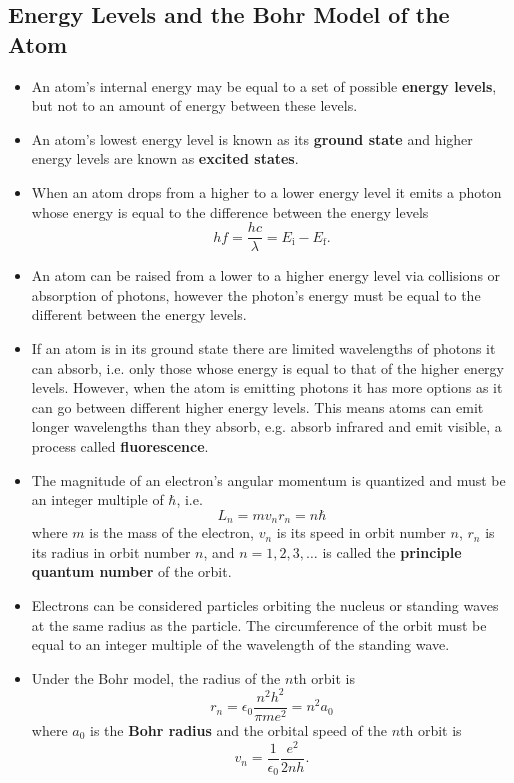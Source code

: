 \documentclass{article}
\begin{document}
\subsection{Energy Levels and the Bohr Model of the Atom}

\begin{itemize}
  \item An atom's internal energy may be equal to a set of possible \textbf{energy levels}, but not to an amount of energy between these levels.

  \item An atom's lowest energy level is known as its \textbf{ground state} and higher energy levels are known as \textbf{excited states}.

  \item When an atom drops from a higher to a lower energy level it emits a photon whose energy is equal to the difference between the energy levels \[h f = \frac{h c}{\lambda} = E_\text{i} - E_\text{f}.\]

  \item An atom can be raised from a lower to a higher energy level via collisions or absorption of photons, however the photon's energy must be equal to the different between the energy levels.

  \item If an atom is in its ground state there are limited wavelengths of photons it can absorb, i.e. only those whose energy is equal to that of the higher energy levels. However, when the atom is emitting photons it has more options as it can go between different higher energy levels. This means atoms can emit longer wavelengths than they absorb, e.g. absorb infrared and emit visible, a process called \textbf{fluorescence}.

  \item The magnitude of an electron's angular momentum is quantized and must be an integer multiple of $\hbar$, i.e. \[L_n = m v_n r_n = n \hbar\] where $m$ is the mass of the electron, $v_n$ is its speed in orbit number $n$, $r_n$ is its radius in orbit number $n$, and $n = 1, 2, 3, \ldots$ is called the \textbf{principle quantum number} of the orbit.

  \item Electrons can be considered particles orbiting the nucleus or standing waves at the same radius as the particle. The circumference of the orbit must be equal to an integer multiple of the wavelength of the standing wave.

  \item Under the Bohr model, the radius of the $n$th orbit is \[r_n = \epsilon_0 \frac{n^2 h^2}{\pi m e^2} = n^2 a_0\] where $a_0$ is the \textbf{Bohr radius} and the orbital speed of the $n$th orbit is \[v_n = \frac{1}{\epsilon_0} \frac{e^2}{2 n h}.\]


\end{itemize}
\end{document}
